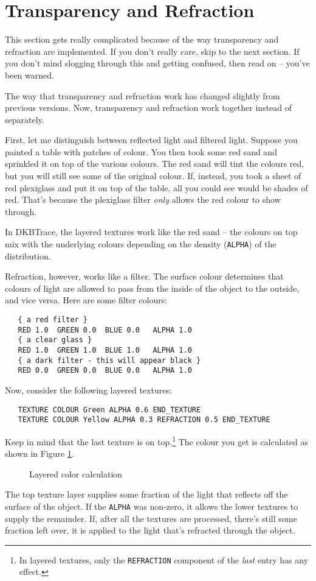 \section{Transparency and Refraction}

This section gets really complicated because of the way transparency and
refraction are implemented.  If you don't really care, skip to the next
section. If you don't mind slogging through this and getting confused, then
read on -- you've been warned.

The way that transparency and refraction work has changed slightly from
previous versions.  Now, transparency and refraction work together instead of
separately.

First, let me distinguish between
reflected light and filtered light.  Suppose
you painted a table with patches of colour.  You then took some red sand and
sprinkled it on top of the various colours.  The red sand will tint the
colours red, but you will still see some of the original colour.  If, instead,
you took a sheet of red plexiglass and put it on top of the table, all you
could see would be shades of red.  That's because the plexiglass filter
{\em only} allows the red colour to show through.

In DKBTrace, the layered textures work like
the red sand -- the colours on top mix with the underlying colours
depending on the density ({\tt ALPHA}) of the
distribution.

Refraction, however, works like a filter.  The
surface colour determines that
colours of light are allowed to pass from the inside of the object to the
outside, and vice versa.  Here are some filter colours:
\begin{verbatim}
   { a red filter }
   RED 1.0  GREEN 0.0  BLUE 0.0   ALPHA 1.0
   { a clear glass }
   RED 1.0  GREEN 1.0  BLUE 1.0   ALPHA 1.0
   { a dark filter - this will appear black }
   RED 0.0  GREEN 0.0  BLUE 0.0   ALPHA 1.0
\end{verbatim}
Now, consider the following layered textures:
\begin{verbatim}
   TEXTURE COLOUR Green ALPHA 0.6 END_TEXTURE
   TEXTURE COLOUR Yellow ALPHA 0.3 REFRACTION 0.5 END_TEXTURE
\end{verbatim}
Keep in mind that the last texture is on top.\footnote{In layered
textures, only the {\tt REFRACTION} component of the {\em last} entry
has any effect.}
The colour you get is calculated as shown in Figure \ref{layers}.
\begin{figure}[htbp]
\begin{centering}

\caption{Layered color calculation}
\label{layers}
\end{centering}
\end{figure}
The top texture layer supplies some fraction of the light that
reflects off the surface of the object.  If the {\tt ALPHA} was
non-zero, it allows the lower textures to supply the remainder.  If,
after all the textures are processed, there's still some fraction left
over, it is applied to the light that's refracted through the object.

